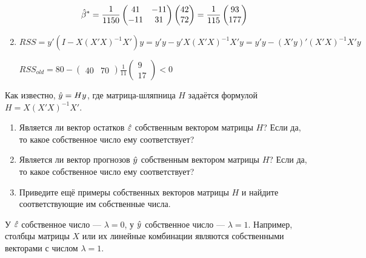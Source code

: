 \begin{problem}
\begin{sol}
\begin{enumerate}
\[
\hat{\beta}^*=\frac{1}{1150}\begin{pmatrix}
41&-11\\
-11&31
\end{pmatrix}
\begin{pmatrix}
42\\
72
\end{pmatrix}=
\frac{1}{115}
\begin{pmatrix}
93\\
177
\end{pmatrix}
\]

\item
$RSS=y'(I-X(X'X)^{-1}X')y=y'y-y'X(X'X)^{-1}X'y=y'y-(X'y)'(X'X)^{-1}X'y$

$RSS_{old}=80-\begin{pmatrix}
40&70
\end{pmatrix}\frac{1}{11}
\begin{pmatrix}
9\\
17
\end{pmatrix}<0
$


\end{enumerate}
\end{sol}
\end{problem}


\begin{problem}
Как известно, $\hat{y}=H y$, где матрица-шляпница $H$ задаётся формулой $H=X(X'X)^{-1}X'$.
\begin{enumerate}
\item Является ли вектор остатков $\hat{\varepsilon}$ собственным вектором матрицы $H$? Если да, то какое собственное число ему соответствует?
\item Является ли вектор прогнозов $\hat{y}$ собственным вектором матрицы $H$? Если да, то какое собственное число ему соответствует?
\item Приведите ещё примеры собственных векторов матрицы $H$ и найдите соответствующие им собственные числа.
\end{enumerate}


\begin{sol}
У $\hat{\varepsilon}$ собственное число — $\lambda=0$, у $\hat{y}$ собственное число — $\lambda=1$. Например, столбцы матрицы $X$ или их линейные комбинации являются собственными векторами с числом $\lambda=1$.
\end{sol}
\end{problem}




